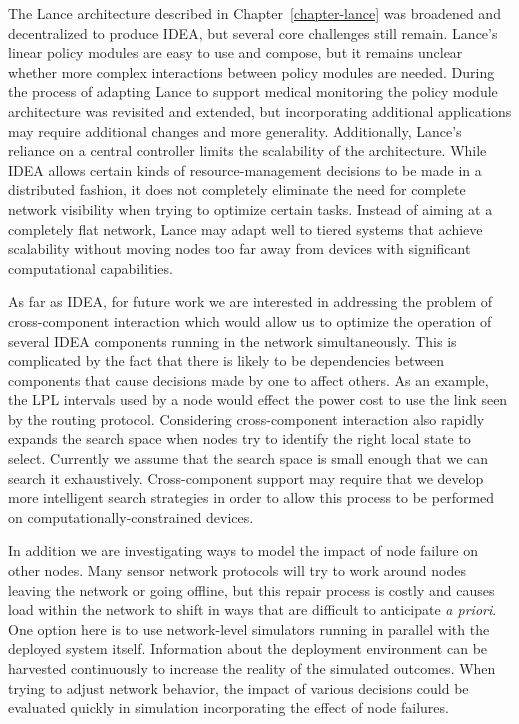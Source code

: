 The Lance architecture described in Chapter~\ref{chapter-lance} was broadened
and decentralized to produce IDEA, but several core challenges still remain.
Lance's linear policy modules are easy to use and compose, but it remains
unclear whether more complex interactions between policy modules are needed.
During the process of adapting Lance to support medical monitoring the policy
module architecture was revisited and extended, but incorporating additional
applications may require additional changes and more generality.
Additionally, Lance's reliance on a central controller limits the scalability
of the architecture. While IDEA allows certain kinds of resource-management
decisions to be made in a distributed fashion, it does not completely
eliminate the need for complete network visibility when trying to optimize
certain tasks. Instead of aiming at a completely flat network, Lance may
adapt well to tiered systems that achieve scalability without moving nodes
too far away from devices with significant computational capabilities.

As far as IDEA, for future work we are interested in addressing the problem
of cross-component interaction which would allow us to optimize the operation
of several IDEA components running in the network simultaneously. This is
complicated by the fact that there is likely to be dependencies between
components that cause decisions made by one to affect others. As an example,
the LPL intervals used by a node would effect the power cost to use the link
seen by the routing protocol. Considering cross-component interaction also
rapidly expands the search space when nodes try to identify the right local
state to select. Currently we assume that the search space is small enough
that we can search it exhaustively. Cross-component support may require that
we develop more intelligent search strategies in order to allow this process
to be performed on computationally-constrained devices.

In addition we are investigating ways to model the impact of node failure on
other nodes. Many sensor network protocols will try to work around nodes
leaving the network or going offline, but this repair process is costly and
causes load within the network to shift in ways that are difficult to
anticipate \textit{a priori}. One option here is to use network-level
simulators running in parallel with the deployed system itself. Information
about the deployment environment can be harvested continuously to increase
the reality of the simulated outcomes. When trying to adjust network
behavior, the impact of various decisions could be evaluated quickly in
simulation incorporating the effect of node failures.

